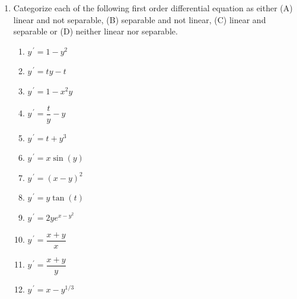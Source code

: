 \documentclass{ximera}
\begin{document}
\begin{enumerate}

\item  Categorize each of the following first order differential equation as either (A) linear and not separable, (B) separable and not linear, (C) linear and separable or (D) neither linear nor separable.



\begin{enumerate}

\vfill

\item $y^{\,\prime}=1-y^2$

\vfill
\vfill

\item $y^{\,\prime}=ty-t$

\vfill
\vfill

\item $y^{\,\prime}=1-x^2y$

\vfill
\vfill


\item $y^{\,\prime}=\dfrac{t}{y}-y$

\vfill
\vfill

\item $y^{\,\prime}=t+y^3$

\vfill
\vfill

\item $y^{\,\prime}=x\sin{(y)}$

\vfill
\vfill


\item $y^{\,\prime}=(x-y)^2$

\vfill
\vfill

\item $y^{\,\prime}=y\tan{(t)}$

\vfill
\vfill

\item $y^{\,\prime}=2ye^{x-y^2}$

\vfill
\vfill


\item $y^{\,\prime}=\dfrac{x+y}{x}$

\vfill
\vfill

\item $y^{\,\prime}=\dfrac{x+y}{y}$

\vfill
\vfill

\item $y^{\,\prime}=x-y^{1/3}$




\end{enumerate}


\end{enumerate}
\end{document}

